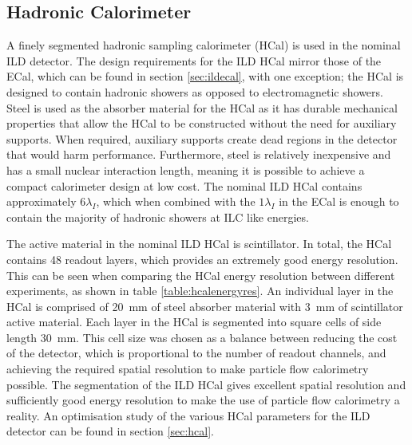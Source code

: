 
\subsection{Hadronic Calorimeter}
A finely segmented hadronic sampling calorimeter (HCal) is used in the nominal ILD detector.  The design requirements for the ILD HCal mirror those of the ECal, which can be found in section \ref{sec:ildecal}, with one exception; the HCal is designed to contain hadronic showers as opposed to electromagnetic showers.  Steel is used as the absorber material for the HCal as it has durable mechanical properties that allow the HCal to be constructed without the need for auxiliary supports.  When required, auxiliary supports create dead regions in the detector that would harm performance.  Furthermore, steel is relatively inexpensive and has a small nuclear interaction length, meaning it is possible to achieve a compact calorimeter design at low cost.  The nominal ILD HCal contains approximately $6 \lambda_{I}$, which when combined with the $1 \lambda_{I}$ in the ECal is enough to contain the majority of hadronic showers at ILC like energies.  

The active material in the nominal ILD HCal is scintillator.  In total, the HCal contains 48 readout layers, which provides an extremely good energy resolution.  This can be seen when comparing the HCal energy resolution between different experiments, as shown in table \ref{table:hcalenergyres}.  An individual layer in the HCal is comprised of 20~mm of steel absorber material with 3~mm of scintillator active material.  Each layer in the HCal is segmented into square cells of side length 30~mm.  This cell size was chosen as a balance between reducing the cost of the detector, which is proportional to the number of readout channels, and achieving the required spatial resolution to make particle flow calorimetry possible.  The segmentation of the ILD HCal gives excellent spatial resolution and sufficiently good energy resolution to make the use of particle flow calorimetry a reality.  An optimisation study of the various HCal parameters for the ILD detector can be found in section \ref{sec:hcal}.

